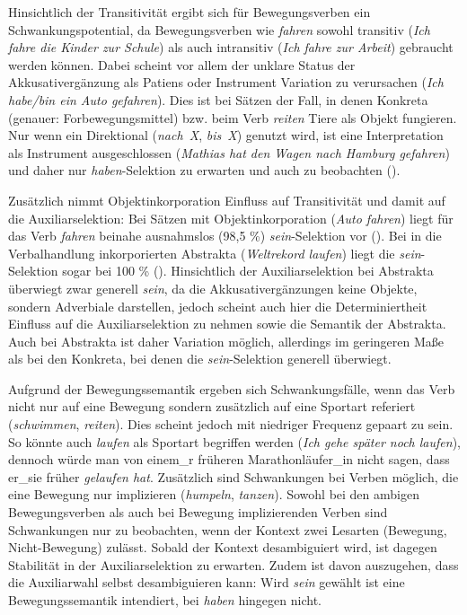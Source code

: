 Hinsichtlich der Transitivität ergibt sich für Bewegungsverben ein Schwankungspotential, da Bewegungsverben wie \textit{fahren} sowohl transitiv (\textit{Ich fahre die Kinder zur Schule}) als auch intransitiv (\textit{Ich fahre zur Arbeit}) gebraucht werden können. Dabei scheint vor allem der unklare Status der Akkusativergänzung als Patiens oder Instrument Variation zu verursachen (\textit{Ich habe/bin ein Auto gefahren}). Dies ist bei Sätzen der Fall, in denen Konkreta (genauer: Forbewegungsmittel) bzw. beim Verb \textit{reiten} Tiere als Objekt fungieren. Nur wenn ein Direktional (\textit{nach~X}, \textit{bis~X}) genutzt wird, ist eine Interpretation als Instrument ausgeschlossen (\textit{Mathias hat den Wagen nach Hamburg gefahren}) und daher nur \textit{haben}-Selektion zu erwarten und auch zu beobachten (\cite[284--286]{Gillmann.2016}). 


Zusätzlich nimmt Objektinkorporation Einfluss auf Transitivität und damit auf die Auxiliarselektion: Bei Sätzen mit Objektinkorporation (\textit{Auto fahren}) liegt für das Verb \textit{fahren} beinahe ausnahmslos (98,5 \%) \textit{sein}-Selektion vor (\cite[290]{Gillmann.2016}). Bei in die Verbalhandlung inkorporierten Abstrakta (\textit{Weltrekord laufen}) liegt die \textit{sein}-Selektion sogar bei 100 \% (\cite[294]{Gillmann.2016}). Hinsichtlich der Auxiliarselektion bei Abstrakta überwiegt zwar generell  \textit{sein}, da die Akkusativergänzungen keine Objekte, sondern Adverbiale darstellen, jedoch scheint auch hier die Determiniertheit Einfluss auf die Auxiliarselektion zu nehmen sowie die Semantik der Abstrakta. Auch bei Abstrakta ist daher Variation möglich, allerdings im geringeren Maße als bei den Konkreta, bei denen die \textit{sein}-Selektion generell überwiegt.  



Aufgrund der Bewegungssemantik ergeben sich Schwankungsfälle, wenn das Verb nicht nur auf eine Bewegung sondern zusätzlich auf eine Sportart referiert (\textit{schwimmen}, \textit{reiten}). Dies scheint jedoch mit niedriger Frequenz gepaart zu sein. So könnte auch \textit{laufen} als Sportart begriffen werden (\textit{Ich gehe später noch laufen}), dennoch würde man von einem\_r früheren Marathonläufer\_in nicht sagen, dass er\_sie früher \textit{gelaufen hat}. Zusätzlich sind Schwankungen bei Verben möglich, die eine Bewegung nur implizieren (\textit{humpeln}, \textit{tanzen}). Sowohl bei den ambigen Bewegungsverben als auch bei Bewegung implizierenden Verben sind Schwankungen nur zu beobachten, wenn der Kontext zwei Lesarten (Bewegung, Nicht-Bewegung) zulässt. Sobald der Kontext desambiguiert wird, ist dagegen Stabilität in der Auxiliarselek\-tion zu erwarten. Zudem ist davon auszugehen, dass die Auxiliarwahl selbst desambiguieren kann: Wird \textit{sein} gewählt ist eine Bewegungssemantik intendiert, bei \textit{haben} hingegen nicht.

